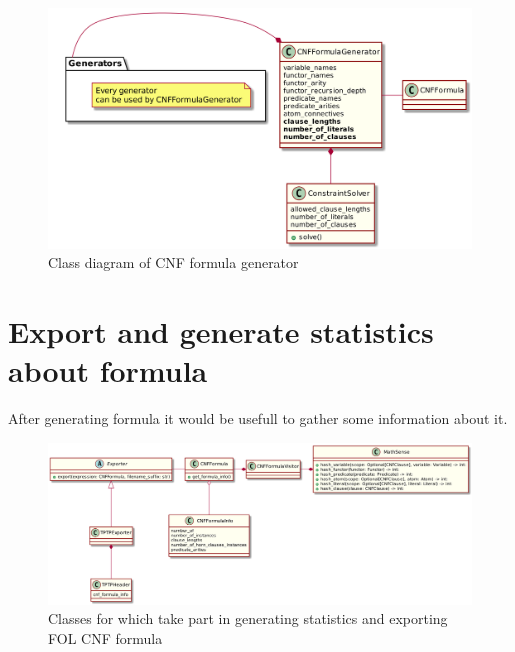 \begin{figure}[h]
\begin{centering}
  \includegraphics[width=\textwidth]{logic-formula-generator/cnf_formula_generator.png}
  \caption{Class diagram of CNF formula generator}
  \label{pic:cnf_generator_class_diagram}
\end{centering}
\end{figure}

\section{Export and generate statistics about formula}
\label{sec:GenerateStatisticsAboutFormula}

After generating formula it would be usefull to gather some information about it. 

\begin{figure}[h]
\begin{centering}
  \includegraphics[width=\textwidth]{logic-formula-generator/fol/cnf_formula_statistics.png}
  \caption{Classes for which take part in generating statistics and exporting FOL CNF formula}
  \label{pic:CNFFormulaInfo}
\end{centering}
\end{figure}
